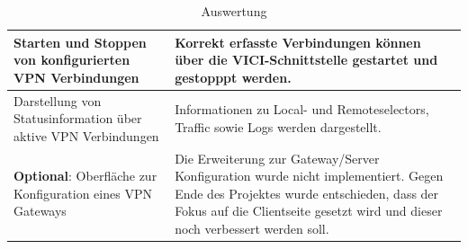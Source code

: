\begin{table}[H]
\begin{tabular}{|p{}|p{}|}
    Starten und Stoppen von konfigurierten VPN Verbindungen & Korrekt erfasste Verbindungen können über die VICI-Schnittstelle gestartet und gestopppt werden. \\ \hline
    Darstellung von Statusinformation über aktive VPN Verbindungen & Informationen zu Local- und Remoteselectors, Traffic sowie Logs werden dargestellt. \\ \hline
    \textbf{Optional}: Oberfläche zur Konfiguration eines VPN Gateways & Die Erweiterung zur Gateway/Server Konfiguration wurde nicht implementiert. Gegen Ende des Projektes wurde entschieden, dass der Fokus auf die Clientseite gesetzt wird und dieser noch verbessert werden soll.   \\ \hline 
    \end{tabular}
    \caption[Auswertung]{Auswertung}
\end{table}
\medskip \medskip